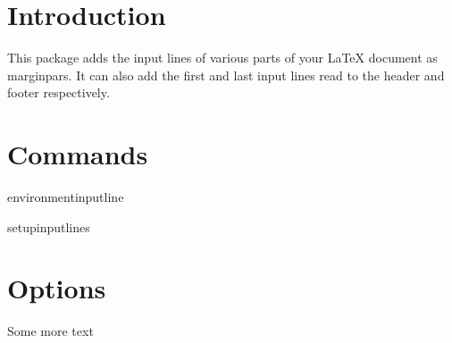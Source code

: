 \documentclass{scrartcl}
\begin{document}
\section{Introduction}
This package adds the input lines of various parts of your LaTeX
document as marginpars.
It can also add the first and last input lines read to the header and
footer respectively.

\section{Commands}

environmentinputline

setupinputlines

\section{Options}
Some more text
\end{document}
